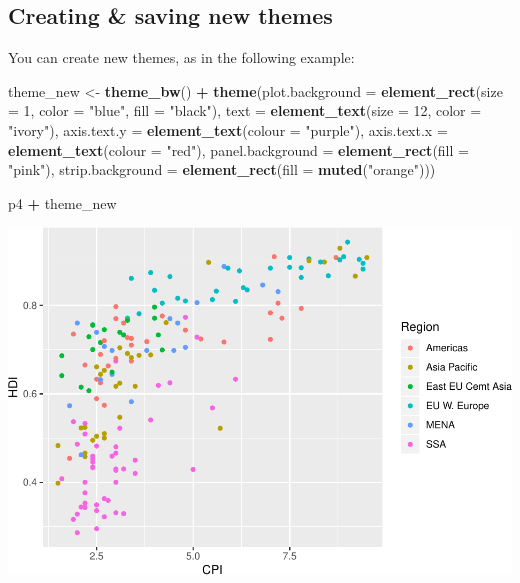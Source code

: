 \documentclass[
]{book}
\newenvironment{Shaded}{\begin{snugshade}}{\end{snugshade}}
\newcommand{\DataTypeTok}[1]{\textcolor[rgb]{0.13,0.29,0.53}{#1}}
\newcommand{\DecValTok}[1]{\textcolor[rgb]{0.00,0.00,0.81}{#1}}
\newcommand{\KeywordTok}[1]{\textcolor[rgb]{0.13,0.29,0.53}{\textbf{#1}}}
\newcommand{\NormalTok}[1]{#1}
\newcommand{\OperatorTok}[1]{\textcolor[rgb]{0.81,0.36,0.00}{\textbf{#1}}}
\newcommand{\StringTok}[1]{\textcolor[rgb]{0.31,0.60,0.02}{#1}}
\begin{document}
\hypertarget{creating-saving-new-themes}{%
\subsection{Creating \& saving new themes}\label{creating-saving-new-themes}}

You can create new themes, as in the following example:

\begin{Shaded}
\begin{Highlighting}[]
\NormalTok{theme\_new \textless{}{-}}\StringTok{ }\KeywordTok{theme\_bw}\NormalTok{() }\OperatorTok{+}
\StringTok{  }\KeywordTok{theme}\NormalTok{(}\DataTypeTok{plot.background =} \KeywordTok{element\_rect}\NormalTok{(}\DataTypeTok{size =} \DecValTok{1}\NormalTok{, }\DataTypeTok{color =} \StringTok{"blue"}\NormalTok{, }\DataTypeTok{fill =} \StringTok{"black"}\NormalTok{),}
        \DataTypeTok{text =} \KeywordTok{element\_text}\NormalTok{(}\DataTypeTok{size =} \DecValTok{12}\NormalTok{, }\DataTypeTok{color =} \StringTok{"ivory"}\NormalTok{),}
        \DataTypeTok{axis.text.y =} \KeywordTok{element\_text}\NormalTok{(}\DataTypeTok{colour =} \StringTok{"purple"}\NormalTok{),}
        \DataTypeTok{axis.text.x =} \KeywordTok{element\_text}\NormalTok{(}\DataTypeTok{colour =} \StringTok{"red"}\NormalTok{),}
        \DataTypeTok{panel.background =} \KeywordTok{element\_rect}\NormalTok{(}\DataTypeTok{fill =} \StringTok{"pink"}\NormalTok{),}
        \DataTypeTok{strip.background =} \KeywordTok{element\_rect}\NormalTok{(}\DataTypeTok{fill =} \KeywordTok{muted}\NormalTok{(}\StringTok{"orange"}\NormalTok{)))}

\NormalTok{p4 }\OperatorTok{+}\StringTok{ }\NormalTok{theme\_new}
\end{Highlighting}
\end{Shaded}

\includegraphics{R/Rgraphics/figures/unnamed-chunk-199-1.pdf}
\end{document}
